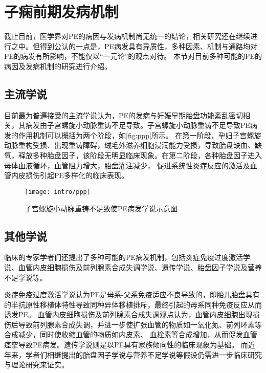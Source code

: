 \section{子痫前期发病机制}
截止目前，医学界对PE的病因与发病机制尚无统一的结论，相关研究还在继续进行之中。但得到公认的一点是，PE病发具有异质性，多种因素、机制与通路均对PE的病发有所影响，不能仅以“一元论”的观点对待。
本节对目前多种可能的PE的病因及发病机制的研究进行介绍。

\subsection{主流学说}
目前最为普遍接受的主流学说认为，PE的发病与妊娠早期胎盘功能紊乱密切相关，其病发由子宫螺旋小动脉重铸不足导致\cite{OAG9,Duvekot2010,2009ix}。子宫螺旋小动脉重铸不足导致PE病发的作用机制可以概括为两个阶段，如\autoref{fig:ppp}所示。
在第一阶段，孕妇子宫螺旋动脉重构受损、出现重铸障碍，绒毛外滋养细胞浸润能力受损，导致胎盘缺血、缺氧，释放多种胎盘因子，该阶段无明显临床现象。在第二阶段，各种胎盘因子进入母体血液循环，血管阻力增大，胎盘灌注减少，
促进系统性炎症反应的激活及血管内皮损伤引起PE多样化的临床表现。
\begin{figure}[htbp]
    \centering
    \texttt{[image: intro/ppp]}
    \caption[子宫螺旋小动脉重铸不足致使PE病发学说示意图]{\label{fig:ppp}子宫螺旋小动脉重铸不足致使PE病发学说示意图\cite{Duvekot2010,2009ix}}
\end{figure}

\subsection{其他学说}
临床的专家学者们还提出了多种可能的PE病发机制，包括炎症免疫过度激活学说、血管内皮细胞损伤及前列腺素合成失调学说、遗传学说、胎盘因子学说及营养不足学说等。

炎症免疫过度激活学说认为PE是母系-父系免疫适应不良导致的，即胎儿胎盘具有的半抗原性移植体特性导致同种异体移植排斥，最终引起的母系同种免疫反应从而诱发PE\cite{Sibai2005,OAG9,Shi2006,Moffett2002}。
血管内皮细胞损伤及前列腺素合成失调观点认为，血管内皮细胞出现损伤后导致前列腺素合成失调，并进一步使扩张血管的物质如一氧化氮、前列环素等合成减少，同时使收缩血管的物质如内皮素、
血栓素等合成增加，从而促发血管痉挛导致PE病发\cite{OAG9,Sibai2005}。遗传学说则是以PE具有家族倾向性的临床现象为基础\cite{OAG9,Sibai2005,Ge2013}。
而近年来，学者们相继提出的胎盘因子学说\cite{Shi2006}与营养不足学说\cite{OAG9}等假设仍需进一步临床研究与理论研究来证实。
\raggedbottom

